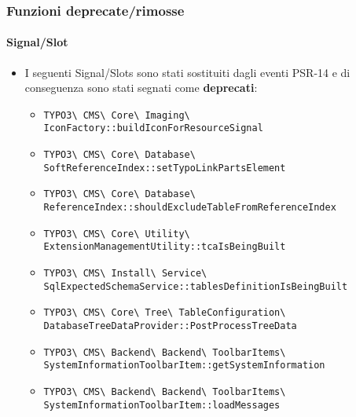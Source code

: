 \begin{frame}[fragile]
	\frametitle{Funzioni deprecate/rimosse}
	\framesubtitle{Signal/Slot}

	\lstset{basicstyle=\tiny\ttfamily}

	\begin{itemize}
		\item I seguenti Signal/Slots sono stati sostituiti dagli eventi PSR-14 e di conseguenza sono stati segnati come \textbf{deprecati}:
			\newline

			\begin{itemize}\tiny
				\item \texttt{TYPO3\textbackslash
					CMS\textbackslash
					Core\textbackslash
					Imaging\textbackslash
					IconFactory::buildIconForResourceSignal}
					\newline
				\item \texttt{TYPO3\textbackslash
					CMS\textbackslash
					Core\textbackslash
					Database\textbackslash
					SoftReferenceIndex::setTypoLinkPartsElement}
					\newline
				\item \texttt{TYPO3\textbackslash
					CMS\textbackslash
					Core\textbackslash
					Database\textbackslash
					ReferenceIndex::shouldExcludeTableFromReferenceIndex}
					\newline
				\item \texttt{TYPO3\textbackslash
					CMS\textbackslash
					Core\textbackslash
					Utility\textbackslash
					ExtensionManagementUtility::tcaIsBeingBuilt}
					\newline
				\item \texttt{TYPO3\textbackslash
					CMS\textbackslash
					Install\textbackslash
					Service\textbackslash
					SqlExpectedSchemaService::tablesDefinitionIsBeingBuilt}
					\newline
				\item \texttt{TYPO3\textbackslash
					CMS\textbackslash
					Core\textbackslash
					Tree\textbackslash
					TableConfiguration\textbackslash
					DatabaseTreeDataProvider::PostProcessTreeData}
					\newline
				\item \texttt{TYPO3\textbackslash
					CMS\textbackslash
					Backend\textbackslash
					Backend\textbackslash
					ToolbarItems\textbackslash
					SystemInformationToolbarItem::getSystemInformation}
					\newline
				\item \texttt{TYPO3\textbackslash
					CMS\textbackslash
					Backend\textbackslash
					Backend\textbackslash
					ToolbarItems\textbackslash
					SystemInformationToolbarItem::loadMessages}

			\end{itemize}

	\end{itemize}

\end{frame}

